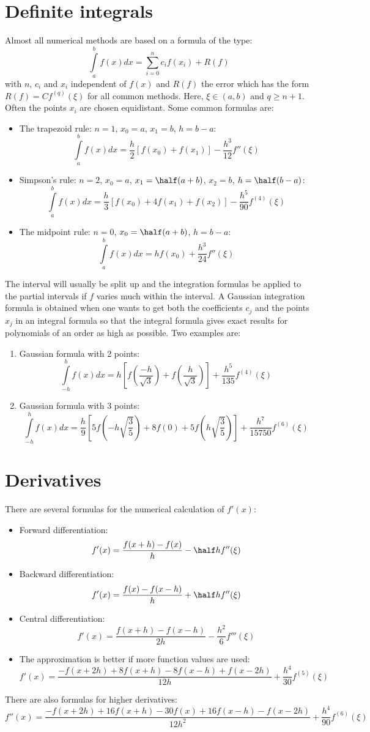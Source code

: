 \section{Definite integrals}
Almost all numerical methods are based on a formula of the type:
\[
\int\limits_a^bf(x)dx=\sum_{i=0}^nc_if(x_i)+R(f)
\]
with $n$, $c_i$ and $x_i$ independent of $f(x)$ and $R(f)$ the error which
has the form $R(f)=Cf^{(q)}(\xi)$ for all common methods. Here, $\xi\in(a,b)$
and $q\geq n+1$. Often the points $x_i$ are chosen equidistant.
Some common formulas are:
\begin{itemize}
\item The trapezoid rule: $n=1$, $x_0=a$, $x_1=b$, $h=b-a$:
\[
\int\limits_a^bf(x)dx=\frac{h}{2}[f(x_0)+f(x_1)]-\frac{h^3}{12}f''(\xi)
\]
\item Simpson's rule: $n=2$, $x_0=a$, $x_1=\half(a+b)$, $x_2=b$, $h=\half(b-a)$:
\[
\int\limits_a^bf(x)dx=\frac{h}{3}[f(x_0)+4f(x_1)+f(x_2)]-\frac{h^5}{90}f^{(4)}(\xi)
\]
\item The midpoint rule: $n=0$, $x_0=\half(a+b)$, $h=b-a$:
\[
\int\limits_a^bf(x)dx=hf(x_0)+\frac{h^3}{24}f''(\xi)
\]
\end{itemize}
The interval will usually be split up and the integration formulas be
applied to the partial intervals if $f$ varies much within the interval.
\npar
A Gaussian integration formula is obtained when one wants to get both the
coefficients $c_j$ and the points $x_j$ in an integral formula so that the
integral formula gives exact results for polynomials of an order as high as
possible. Two examples are:
\begin{enumerate}
\item Gaussian formula with 2 points:
\[
\int\limits_{-h}^hf(x)dx=h\left[f\left(\frac{-h}{\sqrt{3}}\right)+f\left(\frac{h}{\sqrt{3}}\right)\right]+\frac{h^5}{135}f^{(4)}(\xi)
\]
\item Gaussian formula with 3 points:
\[
\int\limits_{-h}^hf(x)dx=\frac{h}{9}\left[5f\left(-h\sqrt{\mbox{$\frac{3}{5}$}}\right)+8f(0)+5f\left(h\sqrt{\mbox{$\frac{3}{5}$}}\right)\right]+\frac{h^7}{15750}f^{(6)}(\xi)
\]
\end{enumerate}

\section{Derivatives}
There are several formulas for the numerical calculation of $f'(x)$:
\begin{itemize}
\item Forward differentiation:
\[
f'(x)=\frac{f(x+h)-f(x)}{h}-\half hf''(\xi)
\]
\item Backward differentiation:
\[
f'(x)=\frac{f(x)-f(x-h)}{h}+\half hf''(\xi)
\]
\item Central differentiation:
\[
f'(x)=\frac{f(x+h)-f(x-h)}{2h}-\frac{h^2}{6}f'''(\xi)
\]
\item The approximation is better if more function values are used:
\[
f'(x)=\frac{-f(x+2h)+8f(x+h)-8f(x-h)+f(x-2h)}{12h}+\frac{h^4}{30}f^{(5)}(\xi)
\]
\end{itemize}
There are also formulas for higher derivatives:
\[
f''(x)=\frac{-f(x+2h)+16f(x+h)-30f(x)+16f(x-h)-f(x-2h)}{12h^2}+\frac{h^4}{90}f^{(6)}(\xi)
\]


